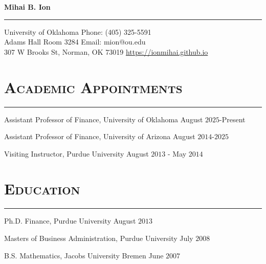 \documentclass[10pt,letterpaper]{article}
\def\name{Mihai B. Ion}
\renewenvironment{itemize}{
  \begin{list}{}{
    \setlength{\leftmargin}{1.5em}
    \setlength{\itemsep}{0.25em}
    \setlength{\parskip}{0pt}
    \setlength{\parsep}{0.25em}
  }
}{
  \end{list}
}
\begin{document}

\centerline{\huge \bf \name}
\vspace{-3mm}
\rule{\textwidth}{0.5mm}

\medskip
  University of Oklahoma \hfill   Phone: (405) 325-5591 \\
 Adams Hall Room 3284 \hfill   Email: mion@ou.edu \\
 307 W Brooks St, Norman, OK 73019   \hfill   \href{https://ionmihai.github.io}{https://ionmihai.github.io}

  
 










\section*{\textsc{Academic Appointments}}
\nointerlineskip
\vspace{-3mm}
\rule{\textwidth}{0.5mm}

\begin{itemize}
  \item Assistant Professor of Finance, University of Oklahoma \hfill August $2025$-Present
  \item Assistant Professor of Finance, University of Arizona \hfill August $2014$-$2025$
\item Visiting Instructor, Purdue University \hfill August $2013$ - May $2014$
\end{itemize}











\section*{\textsc{Education}}
\nointerlineskip
\vspace{-3mm}
\rule{\textwidth}{0.5mm}

\begin{itemize}
  \item Ph.D. Finance, Purdue University \hfill August $2013$
  \item Masters of Business Administration, Purdue University \hfill July $2008$
  \item B.S. Mathematics, Jacobs University Bremen \hfill June $2007$
\end{itemize}
\end{document}
